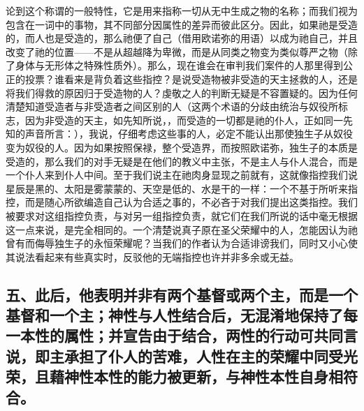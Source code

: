 论到这个称谓的一般特性，它是用来指称一切从无中生成之物的名称；而我们视为包含在一词中的事物，其不同部分因属性的差异而彼此区分。因此，如果祂是受造的，而人也是受造的，那么祂便了自己（借用欧诺弥的用语）以成为祂自己，并且改变了祂的位置——不是从超越降为卑微，而是从同类之物变为类似尊严之物（除了身体与无形体之特殊性质外）。那么，现在谁会在审判我们案件的人那里得到公正的投票？谁看来是背负着这些指控？是说受造物被非受造的天主拯救的人，还是将我们得救的原因归于受造物的人？虔敬之人的判断无疑是不容置疑的。因为任何清楚知道受造者与非受造者之间区别的人（这两个术语的分歧由统治与奴役所标志，因为非受造的天主，如先知所说，，而受造的一切都是祂的仆人，正如同一先知的声音所言：），我说，仔细考虑这些事的人，必定不能认出那使独生子从奴役变为奴役的人。因为如果按照保禄，整个受造界，而按照欧诺弥，独生子的本质是受造的，那么我们的对手无疑是在他们的教义中主张，不是主人与仆人混合，而是一个仆人来到仆人中间。至于我们说主在祂肉身显现之前就有，这就像指控我们说星辰是黑的、太阳是雾蒙蒙的、天空是低的、水是干的一样：一个不基于所听来指控，而是随心所欲编造自己认为合适之事的，不必吝于对我们提出这类指控。我们被要求对这组指控负责，与对另一组指控负责，就它们在我们所说的话中毫无根据这一点来说，是完全相同的。一个清楚说真子原在圣父荣耀中的人，怎能因认为祂曾有而侮辱独生子的永恒荣耀呢？当我们的作者认为合适诽谤我们，同时又小心使其说法看起来有些真实时，反驳他的无端指控也许并非多余或无益。\par


\subsection{五、此后，他表明并非有两个基督或两个主，而是一个基督和一个主；神性与人性结合后，无混淆地保持了每一本性的属性；并宣告由于结合，两性的行动可共同言说，即主承担了仆人的苦难，人性在主的荣耀中同受光荣，且藉神性本性的能力被更新，与神性本性自身相符合。}


